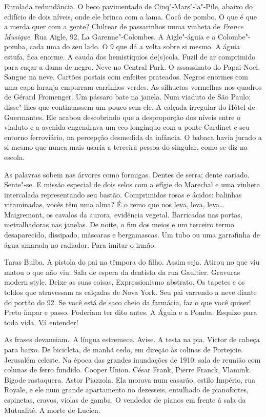 Enrolada redundância. O beco pavimentado de Cinq"-Mars"-la"-Pile, abaixo do
edifício de dois níveis, onde ele brinca com a lama. Cocô de pombo. O
que é que a merda quer com a gente? Chilrear de passarinhos numa vinheta
de \emph{France Musique}. Rua Aigle, 92, La Garenne"-Colombes. A
Aigle"-águia e a Colombe"-pomba, cada uma do seu lado. O 9 que dá a volta
sobre si mesmo. A águia estufa, fica enorme. A cauda dos hemistíquios
de(s)cola. Fuzil de ar comprimido para caçar a dama de negro. Neve no
Central Park. O assassinato do Papai Noel. Sangue na neve. Cartões
postais com enfeites prateados. Negros enormes com uma capa laranja
empurram carrinhos verdes. As silhuetas vermelhas nos quadros de Gérard
Fromenger. Um pássaro bate na janela. Num viaduto de São Paulo;
disse"-lhes que continuassem um pouco sem ele. A calçada irregular do
Hôtel de Guermantes. Ele acabou descobrindo que a desproporção dos
níveis entre o viaduto e a avenida engendrava um eco longínquo com a
ponte Cardinet e seu entorno ferroviário, na percepção desmedida da
infância. O babaca havia jurado a si mesmo que nunca mais usaria a
terceira pessoa do singular, como se diz na escola.

As palavras sobem nas árvores como formigas. Dentes de serra; dente
cariado. Sente"-se. E missão especial de dois selos com a efígie do
Marechal e uma vinheta intercalada representando seu bastão. Comprimidos
rosas e ácidos: balinhas vitaminadas, vocês têm uma alma? É o remo que
nos leva, leva, leva\ldots{} Maigremont, os cavalos da aurora, evidência
vegetal. Barricadas nas portas, metralhadoras nas janelas. De noite, o
fim dos meios e um terceiro termo desaparecido, dissipado, máscaras e
bergamascas. Um tubo ou uma garrafinha de água amarada no radiador. Para
imitar o irmão.

Taras Bulba. A pistola do pai na têmpora do filho. Assim seja. Atirou no
que viu matou o que não viu. Sala de espera da dentista da rua Gaultier.
Gravuras modern style. Deixe as suas coisas. Expressionismo abstrato. Os
tapetes e os toldos que atravessam as calçadas de Nova York. Seu pai
varrendo a neve diante do portão do 92. Se você está de saco cheio da
farmácia, faz o que você quiser! Preto ímpar e passo. Poderiam ter dito
antes. A Águia e a Pomba. Esquizo para toda vida. Vá entender!

As frases devaneiam.~A língua estremece. Avise. A testa na pia. Victor
de cabeça para baixo. De bicicleta, de manhã cedo, em direção às colinas
de Portejoie. Jerusalém celeste. Na época das grandes inundações de
1910; sala de reunião com colunas de ferro fundido. Cooper Union. César
Frank, Pierre Franck, Vlamink. Bigode rastaquera. Astor Piazzola. Ela
morava num casarão, estilo Império, rua Royale, e ele num grande
apartamento no dezesseis, entulhado de pianofortes, espinetas,
cravos, violas de gamba. O vendedor de pianos em frente à sala da
Mutualité. A morte de Lucien.

